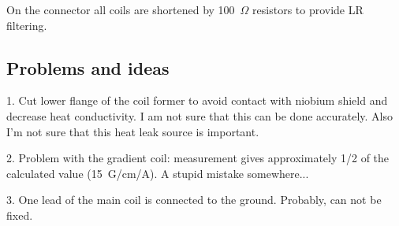 \documentclass[a4paper]{article}
\begin{document}
On the connector all coils are shortened by 100~$\Omega$ resistors to
provide LR filtering.

\subsection*{Problems and ideas}

1. Cut lower flange of the coil former to avoid contact with niobium shield and
decrease heat conductivity. I am not sure that this can be done accurately.
Also I'm not sure that this heat leak source is important.

2. Problem with the gradient coil: measurement gives approximately 1/2 of the
calculated value (15~G/cm/A). A stupid mistake somewhere...

3. One lead of the main coil is connected to the ground. Probably, can
not be fixed.
\end{document}
